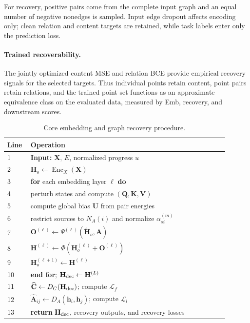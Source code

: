For recovery, positive pairs come from the complete input graph and an equal
number of negative nonedges is sampled.  Input edge dropout affects encoding
only; clean relation and content targets are retained, while task labels enter
only the prediction loss.

\paragraph{Trained recoverability.}
The jointly optimized content MSE and relation BCE provide empirical recovery
signals for the selected targets.  Thus individual points retain content,
point pairs retain relations, and the trained point set functions as an
approximate equivalence class on the evaluated data, measured by Emb, recovery,
and downstream scores.

\begin{table}[t]
  \centering
  \caption{Core embedding and graph recovery procedure.}
  \label{tab:alg-core}
  \small
  \begin{tabular}{p{0.08\linewidth}p{0.82\linewidth}}
    \hline
    Line & Operation \\
    \hline
    1 & \textbf{Input:} $\mathbf X$, $E$, normalized progress $u$ \\
    2 & $\mathbf H_o\leftarrow\operatorname{Enc}_X(\mathbf X)$ \\
    3 & \textbf{for} each embedding layer $\ell$ \textbf{do} \\
    4 & \quad perturb states and compute $(\mathbf Q,\mathbf K,\mathbf V)$ \\
    5 & \quad compute global bias $\mathbf U$ from pair energies \\
    6 & \quad restrict sources to $N_A(i)$ and normalize $\alpha_{si}^{(m)}$ \\
    7 & \quad $\mathbf O^{(\ell)}\leftarrow\Psi^{(\ell)}(\widetilde{\mathbf H}_o,\mathbf A)$ \\
    8 & \quad $\mathbf H^{(\ell)}\leftarrow\Phi(\mathbf H_o^{(\ell)}+\mathbf O^{(\ell)})$ \\
    9 & \quad $\mathbf H_o^{(\ell+1)}\leftarrow\mathbf H^{(\ell)}$ \\
    10 & \textbf{end for}; $\mathbf{H}_{\mathrm{dec}}\leftarrow\mathbf H^{(L)}$ \\
    11 & $\widehat{\mathbf C}\leftarrow D_C(\mathbf{H}_{\mathrm{dec}})$; compute $\mathcal L_f$ \\
    12 & $\widehat{\mathbf A}_{ij}\leftarrow D_A(\mathbf h_i,\mathbf h_j)$; compute $\mathcal L_l$ \\
    13 & \textbf{return} $\mathbf{H}_{\mathrm{dec}}$, recovery outputs, and recovery losses \\
    \hline
  \end{tabular}
\end{table}

